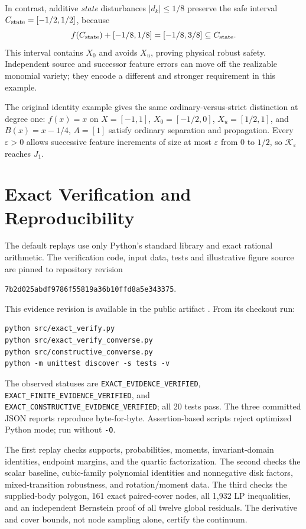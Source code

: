 \documentclass[journal,10pt]{IEEEtran}
\theoremstyle{definition}\newtheorem{definition}{Definition}
\theoremstyle{remark}
\begin{document}
In contrast, additive \emph{state} disturbances $|d_k|\leq1/8$ preserve the safe interval $C_{\rm state}=[-1/2,1/2]$, because
\[
 f(C_{\rm state})+[-1/8,1/8]=[-1/8,3/8]\subseteq C_{\rm state}.
\]
This interval contains $X_0$ and avoids $X_u$, proving physical robust safety. Independent source and successor feature errors can move off the realizable monomial variety; they encode a different and stronger requirement in this example.

The original identity example gives the same ordinary-versus-strict distinction at degree one: $f(x)=x$ on $X=[-1,1]$, $X_0=[-1/2,0]$, $X_u=[1/2,1]$, and $B(x)=x-1/4$, $A=[1]$ satisfy ordinary separation and propagation. Every $\varepsilon>0$ allows successive feature increments of size at most $\varepsilon$ from $0$ to $1/2$, so $\mathcal K_\varepsilon$ reaches $J_1$.


\section{Exact Verification and Reproducibility}\label{sec:reproduction}
The default replays use only Python's standard library and exact rational arithmetic. The verification code, input data, tests and illustrative figure source are pinned to repository revision
\begin{center}\small\texttt{7b2d025abdf9786f55819a36b10ffd8a5e343375}.\end{center}
This evidence revision is available in the public artifact \cite{artifact}. From its checkout run:
\begin{verbatim}
python src/exact_verify.py
python src/exact_verify_converse.py
python src/constructive_converse.py
python -m unittest discover -s tests -v
\end{verbatim}
The observed statuses are \texttt{EXACT\_EVIDENCE\_VERIFIED}, \texttt{EXACT\_FINITE\_EVIDENCE\_VERIFIED}, and \texttt{EXACT\_CONSTRUCTIVE\_EVIDENCE\_VERIFIED}; all 20 tests pass. The three committed JSON reports reproduce byte-for-byte. Assertion-based scripts reject optimized Python mode; run without \texttt{-O}.

The first replay checks supports, probabilities, moments, invariant-domain identities, endpoint margins, and the quartic factorization. The second checks the scalar baseline, cubic-family polynomial identities and nonnegative disk factors, mixed-transition robustness, and rotation/moment data. The third checks the supplied-body polygon, 161 exact paired-cover nodes, all 1,932 LP inequalities, and an independent Bernstein proof of all twelve global residuals. The derivative and cover bounds, not node sampling alone, certify the continuum.
\end{document}
